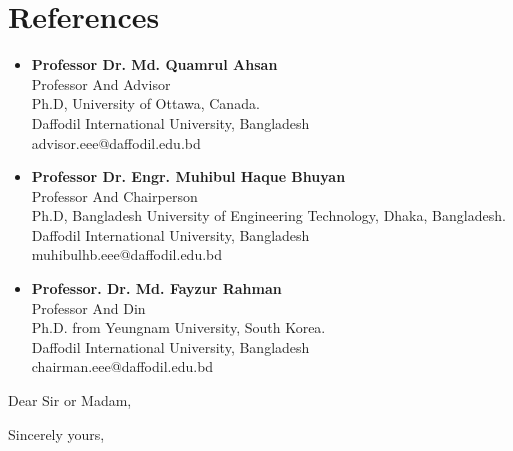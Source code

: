 \documentclass[11pt,a4paper,sans]{moderncv}        %
\begin{document}
\section{References}

\vspace{6pt}
 
\begin{itemize}

\item \textbf{Professor Dr. Md. Quamrul Ahsan} \\Professor And Advisor\\ Ph.D, University of   Ottawa, Canada.\\ Daffodil International University, Bangladesh\\advisor.eee@daffodil.edu.bd

\vspace{10pt}

\item \textbf{Professor Dr. Engr. Muhibul Haque Bhuyan} \\Professor And Chairperson\\ Ph.D, Bangladesh University of Engineering Technology, Dhaka, Bangladesh. \\Daffodil International University, Bangladesh \\muhibulhb.eee@daffodil.edu.bd

\vspace{10pt}

\item \textbf{Professor. Dr. Md. Fayzur Rahman} \\Professor And Din\\ Ph.D. from Yeungnam University, South Korea. \\Daffodil International University, Bangladesh\\chairman.eee@daffodil.edu.bd

\end{itemize}


\clearpage

\date{\today} %
\opening{Dear Sir or Madam,} %
\closing{Sincerely yours,} %
\end{document}

